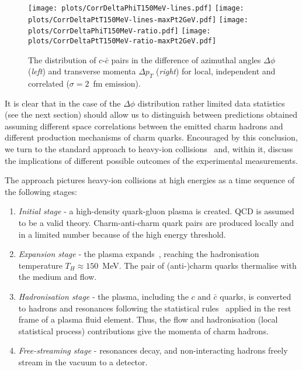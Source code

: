 \documentclass[floatfix,superscriptaddress,a4paper,
               showpieces,showkeys,nofootinbib,preprint]{revtex4-2}
\begin{document}
\begin{figure}[ht]

\texttt{[image: plots/CorrDeltaPhiT150MeV-lines.pdf]} 
\texttt{[image: plots/CorrDeltaPtT150MeV-lines-maxPt2GeV.pdf]} 
\texttt{[image: plots/CorrDeltaPhiT150MeV-ratio.pdf]} 
\texttt{[image: plots/CorrDeltaPtT150MeV-ratio-maxPt2GeV.pdf]} 
\caption{
The distribution of $c$-$\bar{c}$ pairs 
in the difference of azimuthal angles $\Delta\phi$ (\textit{left}) and transverse momenta $\Delta p_T$ (\textit{right}) for local, independent and correlated 
($\sigma = 2$~fm emission).
}
\label{fig:Sim:Corr}
\end{figure} 

It is clear that in the case of the $\Delta\phi$ distribution
rather limited data statistics (see the next section) should allow us to distinguish between predictions obtained assuming different space correlations between the emitted charm hadrons and different production mechanisms of charm quarks.
Encouraged by this conclusion,
we turn to the standard approach to heavy-ion collisions~\cite{Florkowski:Phenomenology}  and, within it, discuss the implications of different possible outcomes of the experimental measurements.

The approach pictures heavy-ion collisions at high energies as a time sequence of the following stages:
\begin{enumerate}[(1)]
\item 
\textit{Initial stage} - a high-density quark-gluon plasma is created.
QCD is assumed to be a valid theory. Charm-anti-charm quark pairs are produced locally and in a limited number because of the high energy threshold.
\item
\textit{Expansion stage} - the plasma expands~\cite{Landau:1953gs}, reaching the hadronisation temperature $T_H \approx 150$~MeV. The pair  of (anti-)charm quarks thermalise with the medium and flow. 
\item
\textit{Hadronisation stage} - the plasma, including the $c$ and $\bar{c}$  quarks, is converted to hadrons and resonances following the statistical rules~\cite{Hagedorn:1980kb, Becattini:2005xt} applied in the rest frame of a plasma fluid element. Thus, the flow and hadronisation (local statistical process) contributions give the momenta of charm hadrons. 
\item
\textit{Free-streaming stage} - resonances decay, and non-interacting hadrons freely stream in the vacuum to a detector.
\end{enumerate}
\end{document}
